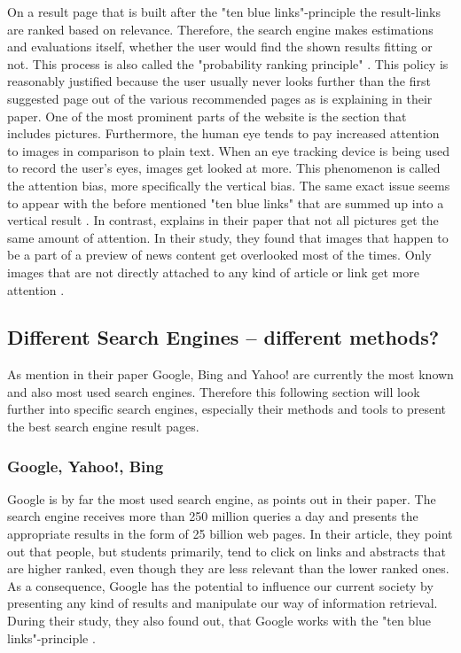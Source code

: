 On a result page that is built after the "ten blue links"-principle the result-links are ranked based on relevance. Therefore, the search engine makes estimations and evaluations itself, whether the user would find the shown results fitting or not. This process is also called the "probability ranking principle" \autocite{wang2016beyond}. This policy is reasonably justified because the user usually never looks further than the first suggested page out of the various recommended pages as \textcite{lewandowski2015evaluating} is explaining in their paper.
One of the most prominent parts of the website is the section that includes pictures. Furthermore, the human eye tends to pay increased attention to images in comparison to plain text. When an eye tracking device is being used to record the user's eyes,  images get looked at more. This phenomenon is called the attention bias, more specifically the vertical bias.
The same exact issue seems to appear with the before mentioned "ten blue links" that are summed up into a vertical result \autocite{wang2016beyond}.
In contrast, \textcite{liu2015influence} explains in their paper that not all pictures get the same amount of attention. In their study, they found that images that happen to be a part of a preview of news content get overlooked most of the times. Only images that are not directly attached to any kind of article or link get more attention \autocite{liu2015influence}.

\subsection{Different Search Engines -- different methods?}
\label{subsection:SearchEngine}
As \textcite{pan2007google, agrawal2015study} mention in their paper Google, Bing and Yahoo! are currently the most known and also most used search engines. Therefore this following section will look further into specific search engines, especially their methods and tools to present the best search engine result pages.

\subsubsection{Google, Yahoo!, Bing}
Google is by far the most used search engine, as \textcite{pan2007google} points out in their paper. The search engine receives more than 250 million queries a day and presents the appropriate results in the form of 25 billion web pages. In their article, they point out that people, but students primarily, tend to click on links and abstracts that are higher ranked, even though they are less relevant than the lower ranked ones. As a consequence, Google has the potential to influence our current society by presenting any kind of results and manipulate our way of information retrieval. During their study, they also found out, that Google works with the "ten blue links"-principle \autocite{pan2007google}.

